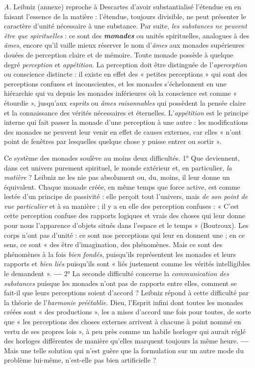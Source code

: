{\it A.} Leibniz (annexe) reproche à Descartes d’avoir substantialisé
l'étendue en en faisant l’essence de la matière : l'étendue, toujours
divisible, ne peut présenter le caractère d’unité nécessaire à une
substance. Par suite, {\it les substances ne peuvent être que spirituelles} :
ce sont des \textbf{\textit {monades}} ou unités spirituelles, analogues à des {\it âmes},
encore qu’il vaille mieux réserver le nom d’{\it âmes} aux monades supérieures
douées de perception claire et de mémoire. Toute monade
possède à quelque degré {\it perception} et {\it appétition}. La perception doit
être distinguée de l’{\it aperception} ou conscience distincte : il existe
en effet des « petites perceptions » qui sont des perceptions confuses
et inconscientes, et les monades s’échelonnent en une hiérarchie qui
va depuis les monades inférieures où la conscience est comme « étourdie »,
jusqu’aux {\it esprits} ou {\it âmes raisonnables} qui possèdent la pensée
claire et la connaissance des vérités nécessaires et éternelles. L’{\it appétition}
est le principe interne qui fait passer la monade d’une perception
à une autre : les modifications des monades ne peuvent
leur venir en effet de causes
externes, car elles « n’ont point de
fenêtres par lesquelles quelque
chose y puisse entrer ou sortir ».

Ce système des monades soulève
au moins deux difficultés. 1° Que
deviennent, dans cet univers purement spirituel, le monde extérieur
et, en particulier, {\it la matière} ? Leibniz
ne les nie pas absolument ou, du,
moins, il leur donne un équivalent.
Chaque monade créée, en même
temps que force active, est comme
lestée d’un principe de passivité :
elle perçoit tout l'univers, mais {\it de
son point de vue particulier} et à sa
manière ; il y a en elle des perception confuses : « C’est cette perception
confuse des rapports logiques et vrais
des choses qui leur donne pour nous
l'apparence d'objets situés dans
l’espace et le temps » (Boutroux).
Les corps n'ont pas d'unité : ce sont
nos perceptions qui leur en donnent
une ; en ce sens, ce sont « des être
d'imagination, des phénomènes.
Mais ce sont des phénomènes à la fois
{\it bien fondés}, puisqu'ils représentent
les monades et leurs rapports et {\it bien
liés} puisqu'ils sont « liés justement
comme les vérités intelligibles le
demandent ». {\bf —} 2° La seconde difficulté concerne la {\it communication des
substances} puisque les monades
n'ont pas de rapports entre elles,
comment se fait-il que leurs perceptions soient d'accord ? Leibniz répond
à cette difficulté par la théorie de
l'\textsf{\textit {harmonie préétablie}}. Dieu, l'Esprit
infini dont toutes les monades créées
sont « des productions », les a mises
d'accord une fois pour toutes, de
sorte que « les perceptions des choses
externes arrivent à chacune à point
nommé en vertu de ses propres lois », à peu près comme un habile horloger
qui aurait réglé des horloges différentes de manière qu’elles marquent
toujours la même heure. {\bf —} Mais une telle solution qui n’est guère que la
formulation sur un autre mode du problème lui-même, n'est-elle pas bien
artificielle ?

